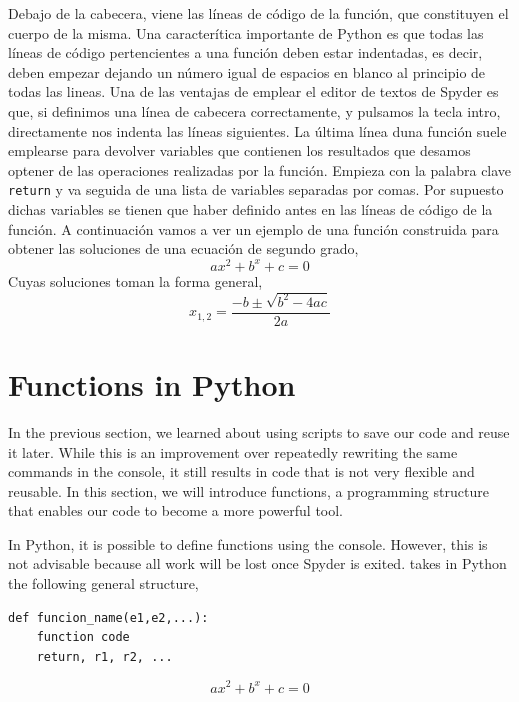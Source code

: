 \begin{paracol}{2}
Debajo de la cabecera, viene las líneas de código de la función, que constituyen el cuerpo de la misma. Una caracterítica importante de Python es que todas las líneas de código pertencientes a una función deben estar indentadas, es decir, deben empezar dejando un número igual de espacios en blanco al principio de todas las lineas. Una de las ventajas de emplear el editor de textos de Spyder es que, si definimos una línea de cabecera correctamente,  y pulsamos la tecla intro, directamente nos indenta las líneas siguientes. La última línea duna función suele emplearse para devolver variables que contienen los resultados que desamos optener de las operaciones realizadas por la función. Empieza con la palabra clave \texttt{return} y va seguida de una lista de variables separadas por comas. Por supuesto dichas variables se tienen que haber definido antes en las líneas de código de la función. A continuación vamos a ver un ejemplo de una función construida para obtener las soluciones de una ecuación de segundo grado,
\begin{equation*}
    ax^2+b^x+c = 0
\end{equation*}
Cuyas soluciones toman la forma general,
\begin{equation*}
    x_{1,2} = \frac{-b\pm \sqrt{b^2-4ac}}{2a}
\end{equation*}
\switchcolumn
\section[Functions in Python]{Functions in Python} 
In the previous section, we learned about using scripts to save our code and reuse it later. While this is an improvement over repeatedly rewriting the same commands in the console, it still results in code that is not very flexible and reusable. In this section, we will introduce functions, a programming structure that enables our code to become a more powerful tool.

In Python, it is possible to define functions using the console. However, this is not advisable because all work will be lost once Spyder is exited. takes in Python the following general structure,

\begin{verbatim}
def funcion_name(e1,e2,...):
    function code
    return, r1, r2, ...
\end{verbatim}
\begin{equation*}
    ax^2+b^x+c = 0
\end{equation*}


\end{paracol}
